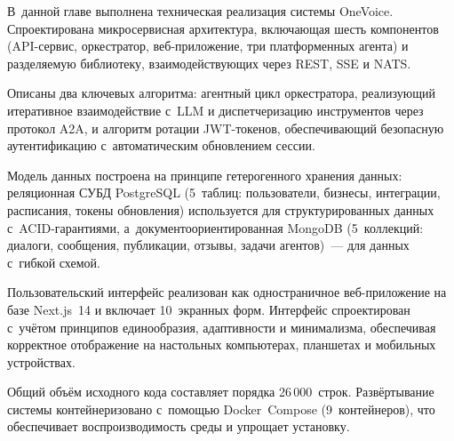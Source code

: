 В~данной главе выполнена техническая реализация системы OneVoice. Спроектирована микросервисная архитектура, включающая шесть компонентов (API-сервис, оркестратор, веб-приложение, три платформенных агента) и разделяемую библиотеку, взаимодействующих через REST, SSE и NATS.

Описаны два ключевых алгоритма: агентный цикл оркестратора, реализующий итеративное взаимодействие с~LLM и диспетчеризацию инструментов через протокол A2A, и алгоритм ротации JWT-токенов, обеспечивающий безопасную аутентификацию с~автоматическим обновлением сессии.

Модель данных построена на принципе гетерогенного хранения данных: реляционная СУБД PostgreSQL (5~таблиц: пользователи, бизнесы, интеграции, расписания, токены обновления) используется для структурированных данных с~ACID-гарантиями, а~документоориентированная MongoDB (5~коллекций: диалоги, сообщения, публикации, отзывы, задачи агентов)~--- для данных с~гибкой схемой.

Пользовательский интерфейс реализован как одностраничное веб-приложение на базе Next.js~14 и включает 10~экранных форм. Интерфейс спроектирован с~учётом принципов единообразия, адаптивности и минимализма, обеспечивая корректное отображение на настольных компьютерах, планшетах и мобильных устройствах.

Общий объём исходного кода составляет порядка 26\,000~строк. Развёртывание системы контейнеризовано с~помощью Docker~Compose (9~контейнеров), что обеспечивает воспроизводимость среды и упрощает установку.
